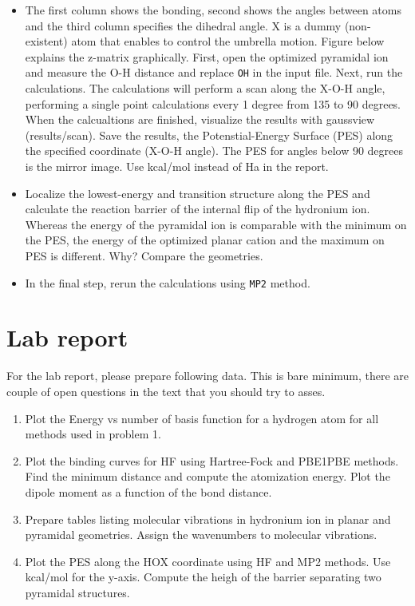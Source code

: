 \begin{itemize}
\item The first column shows the bonding, second shows the angles between atoms and the third column specifies the dihedral angle. X is a dummy (non-existent) atom that enables to control the umbrella motion. Figure below explains the z-matrix graphically. First, open the optimized pyramidal ion and measure the O-H distance and replace \texttt{OH} in the input file. Next, run the calculations. The calculations will perform a scan along the X-O-H angle, performing a single point calculations every 1 degree from 135 to 90 degrees. When the calcualtions are finished, visualize the results with gaussview (results/scan). Save the results, the Potenstial-Energy Surface (PES) along the specified coordinate (X-O-H angle). The PES for angles below 90 degrees is the mirror image. Use kcal/mol instead of Ha in the report. 

\item Localize the lowest-energy and transition structure along the PES and calculate the reaction barrier of the internal flip of the hydronium ion. Whereas the energy of the pyramidal ion is comparable with the minimum on the PES, the energy of the optimized planar cation and the maximum on PES is different. Why? Compare the geometries. 

\item In the final step, rerun the calculations using \texttt{MP2} method. 


\end{itemize}

\section*{Lab report}

For the lab report, please prepare following data. This is bare minimum, there are couple of open questions in the text that you should try to asses. 

\begin{enumerate}
 \item Plot the Energy vs number of basis function for a hydrogen atom for all methods used in problem 1. 
 
 \item Plot the binding curves for HF using Hartree-Fock and PBE1PBE methods. Find the minimum distance and compute the atomization energy. Plot the dipole moment as a function of the bond distance. 
 
 \item Prepare tables listing molecular vibrations in hydronium ion in planar and pyramidal geometries. Assign the wavenumbers to molecular vibrations. 
 
 \item Plot the PES along the HOX coordinate using HF and MP2 methods. Use kcal/mol for the y-axis. Compute the heigh of the barrier separating two pyramidal structures. 
  
\end{enumerate}


